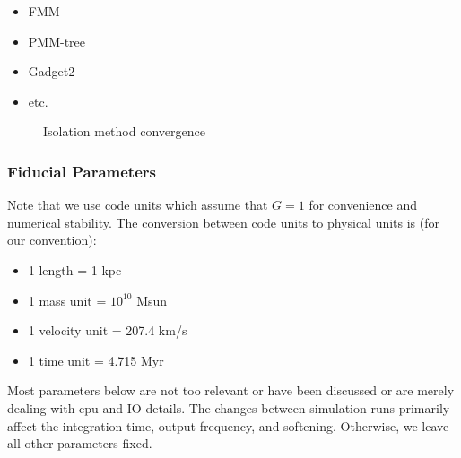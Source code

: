 \begin{itemize}
\tightlist
\item
  FMM
\item
  PMM-tree
\item
  Gadget2
\item
  etc.
\end{itemize}

\begin{figure}
\centering
{}
\caption{Isolation method convergence}\label{fig:methods_convergence}
\end{figure}

\subsubsection{Fiducial Parameters}\label{fiducial-parameters}

Note that we use code units which assume that \(G=1\) for convenience
and numerical stability. The conversion between code units to physical
units is (for our convention):

\begin{itemize}
\tightlist
\item
  1 length = 1 kpc
\item
  1 mass unit = \(10^{10}\) Msun
\item
  1 velocity unit = 207.4 km/s
\item
  1 time unit = 4.715 Myr
\end{itemize}

Most parameters below are not too relevant or have been discussed or are
merely dealing with cpu and IO details. The changes between simulation
runs primarily affect the integration time, output frequency, and
softening. Otherwise, we leave all other parameters fixed.

